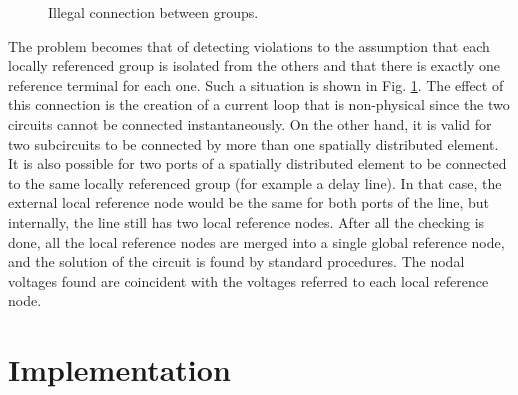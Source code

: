 %
%
\begin{figure}[htpb]
\centerline{\epsfxsize=2.5in }
\caption{Illegal connection between groups.} \label{fig:current_loop}
\end{figure}
%
The problem becomes that of detecting violations to the assumption
that each locally referenced group is isolated from the others and
that there is exactly one reference terminal for each one. Such a
situation is shown in Fig. \ref{fig:current_loop}. The effect of this
connection is the creation of a current loop that is non-physical
since the two circuits cannot be connected instantaneously. On the
other hand, it is valid for two subcircuits to be connected by more
than one spatially distributed element. It is also possible for two
ports of a spatially distributed element to be connected to the same
locally referenced group (for example a delay line). In that case, the
external local reference node would be the same for both ports of the
line, but internally, the line still has two local reference nodes.
After all the checking is done, all the local reference nodes are
merged into a single global reference node, and the solution of the
circuit is found by standard procedures. The nodal voltages found are
coincident with the voltages referred to each local reference node.


\section{Implementation}

